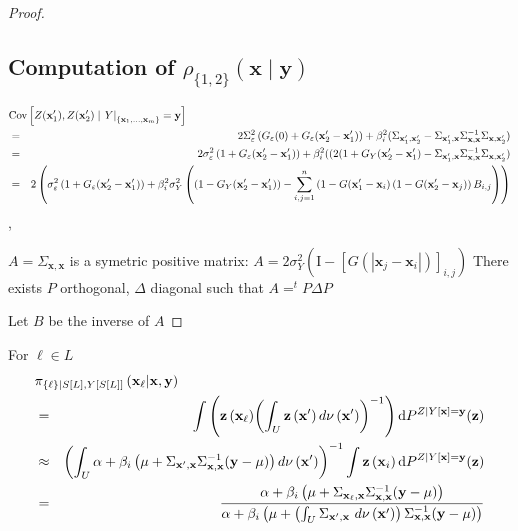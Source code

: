 \documentclass[12pt]{article}
\theoremstyle{definition}
\theoremstyle{remark}
\newcommand{\dominantU}{\nu}
\newcommand{\sampledensity}{\mathbf{\pi}}
\newcommand{\provar}{\Sigma}
\newcommand{\Cov}{\mathrm{Cov}}
\newcommand{\derive}{\mathrm{d}}
\newcommand{\Semivariogram}{G}
\newcommand{\Sample}{S}
\newcommand{\position}{\mathbf{x}}
\newcommand{\Sampleindex}{L}
\newcommand{\Signal}{Y}
\newcommand{\signal}{\mathbf{y}}
\newcommand{\Desvar}{Z}
\newcommand{\desvar}{\mathbf{z}}
\begin{document}
\begin{proof}
\subsection{Computation of $\rho_{\{1,2\}}(\position\mid\signal)$}

\begin{eqnarray*}
\lefteqn{\Cov\left[\Desvar(\position'_1),\Desvar(\position'_2)\mid \left.\Signal\right|_{\{\position_{1},\dots,\position_{m}\}}=\signal
\right]}\\&=&2\provar^2_\varepsilon \left(\Semivariogram_\varepsilon(0)+\Semivariogram_\varepsilon(\position_2'-\position_1')\right)+\beta_i^2(
\provar_{\position'_1,\position'_2}-\provar_{\position'_1,\position}\provar_{\position,\position}^{-1}\provar_{\position,\position'_2})\\
&=& 2\sigma^2_\varepsilon \left(1+\Semivariogram_\varepsilon(\position_2'-\position_1')\right)+\beta_i^2(
(2(1+\Semivariogram_\Signal(\position'_2-\position'_1)-\provar_{\position'_1,\position}\provar_{\position,\position}^{-1}\provar_{\position,\position'_2})\\
&=& 2\left(\sigma^2_\varepsilon \left(1+\Semivariogram_\varepsilon(\position_2'-\position_1')\right)+\beta_i^2
\sigma^2_Y\left(\left(1-\Semivariogram_\Signal(\position'_2-\position'_1)\right)-\sum_{i,j=1}^n \left(1-\Semivariogram(\position'_1-\position_i\right)\left(1-\Semivariogram(\position'_2-\position_j)\right)B_{i,j}\right)\right)
\end{eqnarray*},




$A=\provar_{\position,\position}$ is a symetric positive matrix:
$A=2\sigma^2_Y (\mathrm{I}-[\Semivariogram(|\position_j-\position_i|)]_{i,j})$
There exists $P$ orthogonal, $\Delta$ diagonal such that $A=^tP\Delta P$

Let $B$ be the inverse of $A$
\end{proof}


For $\ell\in \Sampleindex$
\begin{eqnarray}\label{eq:ojdoifj1}
\lefteqn{\sampledensity_{\{\ell\}\mid \Sample[\Sampleindex], \Signal[\Sample[\Sampleindex]]}\left(\position_\ell|\position,\signal\right)}\\&=&
\int\left({\desvar\left(\position_{\ell}\right)} {\left(\int_{U}{\desvar\left(\position'\right)d\dominantU\left(\position'\right)}\right)^{-1}}\right) \derive P^{\Desvar\mid\Signal[\position]=
    \signal}(\desvar)\\&\approx&
    \left(\int_{U}{\alpha+\beta_i\left(\mu+\Sigma_{\position',\position}\Sigma_{\position,\position}^{-1} (\signal-\mu)\right)d\dominantU\left(\position'\right)}\right)^{-1}\int\desvar\left(\position_{i}\right)  \derive P^{\Desvar\mid\Signal[\position]=
    \signal}(\desvar)\label{eq:ojdoifj2}\\
    &=&
    \frac{
    \alpha+\beta_i\left(\mu+\Sigma_{\position_\ell,\position}\Sigma_{\position,\position}^{-1} (\signal-\mu)\right)}{\alpha+\beta_i\left(\mu+\left(\int_{U}\Sigma_{\position',\position}~d\dominantU\left(\position'\right)\right)\Sigma_{\position,\position}^{-1} (\signal-\mu)\right)}
    \end{eqnarray}
    
\end{document}
